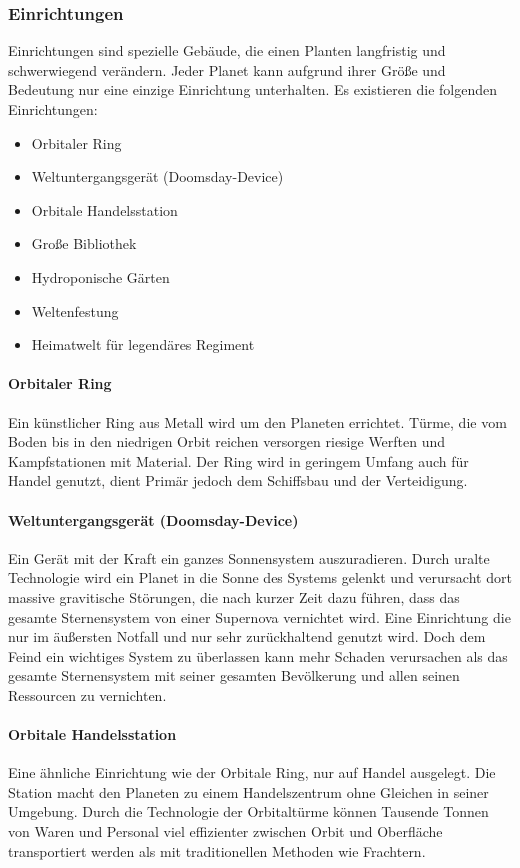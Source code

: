 \documentclass[11pt, a4paper]{article}
\begin{document}
\subsubsection{Einrichtungen}
Einrichtungen sind spezielle Gebäude, die einen Planten langfristig und schwerwiegend verändern.
Jeder Planet kann aufgrund ihrer Größe und Bedeutung nur eine einzige Einrichtung unterhalten.
Es existieren die folgenden Einrichtungen:
\begin{itemize}
	\item Orbitaler Ring
	\item Weltuntergangsgerät (Doomsday-Device)
	\item Orbitale Handelsstation
	\item Große Bibliothek
	\item Hydroponische Gärten
	\item Weltenfestung
	\item Heimatwelt für legendäres Regiment
\end{itemize}
%
\paragraph{Orbitaler Ring}
Ein künstlicher Ring aus Metall wird um den Planeten errichtet. Türme, die vom Boden bis in den niedrigen
Orbit reichen versorgen riesige Werften und Kampfstationen mit Material. Der Ring wird in geringem Umfang auch
für Handel genutzt, dient Primär jedoch dem Schiffsbau und der Verteidigung.
%
\paragraph{Weltuntergangsgerät (Doomsday-Device)}
Ein Gerät mit der Kraft ein ganzes Sonnensystem auszuradieren. Durch uralte Technologie wird ein Planet in die
Sonne des Systems gelenkt und verursacht dort massive gravitische Störungen, die nach kurzer Zeit dazu führen,
dass das gesamte Sternensystem von einer Supernova vernichtet wird. Eine Einrichtung die nur im äußersten Notfall
und nur sehr zurückhaltend genutzt wird. Doch dem Feind ein wichtiges System zu überlassen kann mehr Schaden
verursachen als das gesamte Sternensystem mit seiner gesamten Bevölkerung und allen seinen Ressourcen zu
vernichten.
%
\paragraph{Orbitale Handelsstation}
Eine ähnliche Einrichtung wie der Orbitale Ring, nur auf Handel ausgelegt. Die Station macht den Planeten
zu einem Handelszentrum ohne Gleichen in seiner Umgebung. Durch die Technologie der Orbitaltürme können
Tausende Tonnen von Waren und Personal viel effizienter zwischen Orbit und Oberfläche transportiert werden
als mit traditionellen Methoden wie Frachtern.
%
\end{document}

